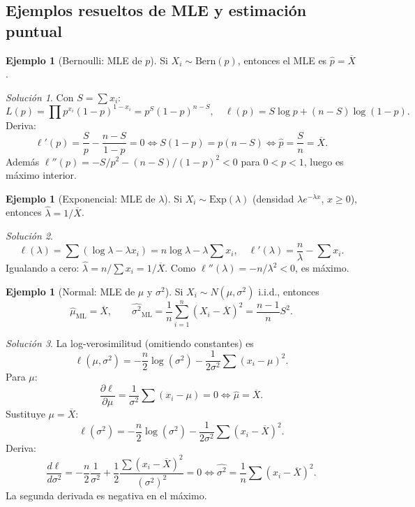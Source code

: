 \documentclass[11pt]{article}
\theoremstyle{plain}
\theoremstyle{definition}
\newtheorem{example}[theorem]{Ejemplo}
\theoremstyle{remark}
\theoremstyle{solstyle}
\newtheorem*{solution}{Solución}
\newcommand{\1}{\mathbbm{1}}
\newcommand{\Xbar}{\overline{X}}
\begin{document}
\subsection{Ejemplos resueltos de MLE y estimación puntual}

\begin{example}[Bernoulli: MLE de $p$]\label{ex:mle-bernoulli}
Si $X_i\sim \mathrm{Bern}(p)$, entonces el MLE es $\widehat p=\overline X$.
\end{example}

\begin{solution}
Con $S=\sum x_i$:
\[
L(p)=\prod p^{x_i}(1-p)^{1-x_i}=p^{S}(1-p)^{n-S},
\quad
\ell(p)=S\log p+(n-S)\log(1-p).
\]
Deriva:
\[
\ell'(p)=\frac{S}{p}-\frac{n-S}{1-p}=0
\iff S(1-p)=p(n-S)\iff \widehat p=\frac{S}{n}=\overline X.
\]
Además $\ell''(p)=-S/p^2-(n-S)/(1-p)^2<0$ para $0<p<1$, luego es máximo interior.
\end{solution}

\begin{example}[Exponencial: MLE de $\lambda$]\label{ex:mle-exp}
Si $X_i\sim \mathrm{Exp}(\lambda)$ (densidad $\lambda e^{-\lambda x}$, $x\ge0$), entonces
$\widehat\lambda=1/\overline X$.
\end{example}

\begin{solution}
\[
\ell(\lambda)=\sum(\log\lambda-\lambda x_i)=n\log\lambda-\lambda\sum x_i,
\quad
\ell'(\lambda)=\frac{n}{\lambda}-\sum x_i.
\]
Igualando a cero: $\widehat\lambda=n/\sum x_i=1/\overline X$.
Como $\ell''(\lambda)=-n/\lambda^2<0$, es máximo.
\end{solution}

\begin{example}[Normal: MLE de $\mu$ y $\sigma^2$]\label{ex:mle-normal}
Si $X_i\sim N(\mu,\sigma^2)$ i.i.d., entonces
\[
\widehat\mu_{\text{ML}}=\Xbar,\qquad
\widehat{\sigma^2}_{\text{ML}}=\frac1n\sum_{i=1}^n (X_i-\Xbar)^2=\frac{n-1}{n}S^2.
\]
\end{example}

\begin{solution}
La log-verosimilitud (omitiendo constantes) es
\[
\ell(\mu,\sigma^2)= -\frac{n}{2}\log(\sigma^2)-\frac{1}{2\sigma^2}\sum (x_i-\mu)^2.
\]
Para $\mu$:
\[
\frac{\partial \ell}{\partial \mu}=\frac{1}{\sigma^2}\sum(x_i-\mu)=0 \iff \widehat\mu=\Xbar.
\]
Sustituye $\mu=\Xbar$:
\[
\ell(\sigma^2)= -\frac{n}{2}\log(\sigma^2)-\frac{1}{2\sigma^2}\sum (x_i-\Xbar)^2.
\]
Deriva:
\[
\frac{d\ell}{d\sigma^2}=-\frac{n}{2}\frac{1}{\sigma^2}+\frac{1}{2}\frac{\sum (x_i-\Xbar)^2}{(\sigma^2)^2}=0
\iff \widehat{\sigma^2}=\frac1n\sum (x_i-\Xbar)^2.
\]
La segunda derivada es negativa en el máximo.
\end{solution}
\end{document}
